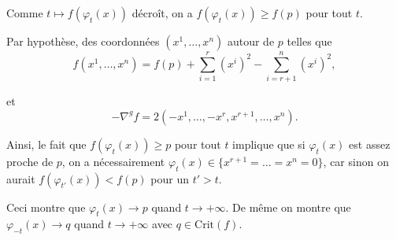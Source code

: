 \documentclass[a4paper,12pt,openany]{article}
\theoremstyle{plain}
\theoremstyle{definition}
\begin{document}
\begin{enumerate}
 


Comme $t \mapsto f (\varphi_t(x))$ d\'ecro\^it, on a $f(\varphi_t(x)) \geqslant f(p)$ pour tout $t$. 

 


Par hypoth\`ese, des coordonn\'ees $(x^1, \dots, x^n)$ autour de $p$ telles que 
$$
f(x^1, \dots, x^n) = f(p) + \sum_{i=1}^r (x^i)^2 - \sum_{i = r+1}^n (x^i)^2,
$$

et 
$$
-\nabla^g f = 2(-x^1, \dots, -x^r, x^{r+1}, \dots, x^n).
$$

Ainsi, le fait que $f(\varphi_t(x)) \geqslant p$ pour tout $t$ implique que si $\varphi_t(x)$ est assez proche de $p$, on a n\'ecessairement $\varphi_t(x) \in \{x^{r+1} = \dots = x^{n} = 0\}$, car sinon on aurait $f(\varphi_{t'}(x)) < f(p)$ pour un $t' > t$.

 


Ceci montre que $\varphi_t(x) \to p$ quand $t \to +\infty$. De m\^eme on montre que $\varphi_{-t}(x) \to q$ quand $t \to +\infty$ avec $q \in \mathrm{Crit}(f)$.
\end{enumerate}
\end{document}
